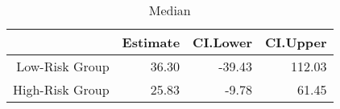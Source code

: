 \begin{table}[ht]
\centering
\caption{\tiny Median} 
\begin{tabular}{rrrr}
  \hline
 & Estimate & CI.Lower & CI.Upper \\ 
  \hline
Low-Risk Group & 36.30 & -39.43 & 112.03 \\ 
  High-Risk Group & 25.83 & -9.78 & 61.45 \\ 
   \hline
\end{tabular}
\end{table}
